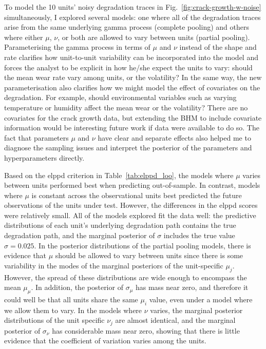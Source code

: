 To model the 10 units' noisy degradation traces in Fig.~\ref{fig:crack-growth-w-noise} simultaneously, I explored several models: one where all of the degradation traces arise from the same underlying gamma process (complete pooling) and others where either $\mu$, $\nu$, or both are allowed to vary between units (partial pooling). Parameterising the gamma process in terms of $\mu$ and $\nu$ instead of the shape and rate clarifies how unit-to-unit variability can be incorporated into the model and forces the analyst to be explicit in how he/she expect the units to vary: should the mean wear rate vary among units, or the volatility? In the same way, the new parameterisation also clarifies how we might model the effect of covariates on the degradation. For example, should environmental variables such as varying temperature or humidity affect the mean wear or the volatility? There are no covariates for the crack growth data, but extending the BHM to include covariate information would be interesting future work if data were available to do so. The fact that parameters $\mu$ and $\nu$ have clear and separate effects also helped me to diagnose the sampling issues and interpret the posterior of the parameters and hyperparameters directly.

Based on the elppd criterion in Table~\ref{tab:elppd_loo}, the models where $\mu$ varies between units performed best when predicting out-of-sample. In contrast, models where $\mu$ is constant across the observational units best predicted the future observations of the units under test. However, the differences in the elppd scores were relatively small. All of the models explored fit the data well: the predictive distributions of each unit's underlying degradation path contains the true degradation path, and the marginal posterior of $\sigma$ includes the true value $\sigma = 0.025$. In the posterior distributions of the partial pooling models, there is evidence that $\mu$ should be allowed to vary between units since there is some variability in the modes of the marginal posteriors of the unit-specific $\mu_j$. However, the spread of these distributions are wide enough to encompass the mean $\mu_\mu$. In addition, the posterior of $\sigma_\mu$ has mass near zero, and therefore it could well be that all units share the same $\mu_i$ value, even under a model where we allow them to vary. In the models where $\nu$ varies, the marginal posterior distributions of the unit specific $\nu_j$ are almost identical, and the marginal posterior of $\sigma_\nu$ has considerable mass near zero, showing that there is little evidence that the coefficient of variation varies among the units.

